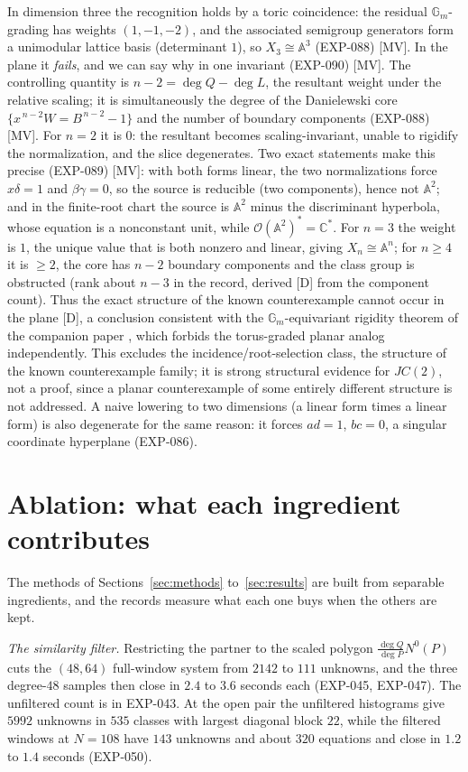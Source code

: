 \documentclass[11pt]{article}
\theoremstyle{remark}
\newcommand{\C}{\mathbb{C}}
\begin{document}
In dimension three the recognition holds by a toric coincidence: the residual
$\mathbb{G}_m$-grading has weights $(1,-1,-2)$, and the associated semigroup generators
form a unimodular lattice basis (determinant $1$), so $X_3\cong\mathbb{A}^3$ (EXP-088) [MV]. In the plane it \emph{fails},
and we can say why in one invariant (EXP-090) [MV]. The controlling quantity is
$n-2=\deg Q-\deg L$, the resultant weight under the relative scaling; it is
simultaneously the degree of the Danielewski core
$\{x^{\,n-2}W=B^{\,n-2}-1\}$ and the number of boundary components (EXP-088) [MV]. For $n=2$ it is
$0$: the resultant becomes scaling-invariant, unable to rigidify the normalization,
and the slice degenerates. Two exact statements make this precise (EXP-089) [MV]:
with both forms linear, the two normalizations force $x\delta=1$ and $\beta\gamma=0$, so the source is reducible (two components),
hence not $\mathbb{A}^2$; and in the finite-root chart the source is $\mathbb{A}^2$ minus the discriminant hyperbola, whose
equation is a nonconstant unit, while $\mathcal{O}(\mathbb{A}^2)^*=\C^*$. For $n=3$ the weight is $1$, the unique value that is both
nonzero and linear, giving $X_n\cong\mathbb{A}^n$; for $n\ge4$ it is $\ge2$, the core has $n-2$ boundary components and the
class group is obstructed (rank about $n-3$ in the record, derived [D] from the component count). Thus the exact structure of the known
counterexample cannot occur in the plane [D], a conclusion consistent with the
$\mathbb{G}_m$-equivariant rigidity theorem of the companion paper \cite{SLfoundational},
which forbids the torus-graded planar
analog independently. This excludes the incidence/root-selection class, the structure
of the known counterexample family; it is strong structural
evidence for $JC(2)$, not a proof, since a planar counterexample of some entirely
different structure is not addressed. A naive lowering to two dimensions (a linear form times a linear form) is also degenerate
for the same reason: it forces $ad=1$, $bc=0$, a singular coordinate hyperplane (EXP-086).

\section{Ablation: what each ingredient contributes}\label{sec:ablation}

The methods of Sections~\ref{sec:methods} to~\ref{sec:results} are built from separable ingredients, and the records measure what each
one buys when the others are kept.

\emph{The similarity filter.} Restricting the partner to the scaled polygon $\tfrac{\deg Q}{\deg P}N^0(P)$ cuts the $(48,64)$ full-window
system from $2142$ to $111$ unknowns, and the three degree-$48$ samples then close in $2.4$ to $3.6$ seconds each (EXP-045, EXP-047). The unfiltered count is in EXP-043. At the open
pair the unfiltered histograms give $5992$ unknowns in $535$ classes with largest diagonal block $22$, while the filtered windows at $N=108$ have $143$
unknowns and about $320$ equations and close in $1.2$ to $1.4$ seconds (EXP-050).
\end{document}
